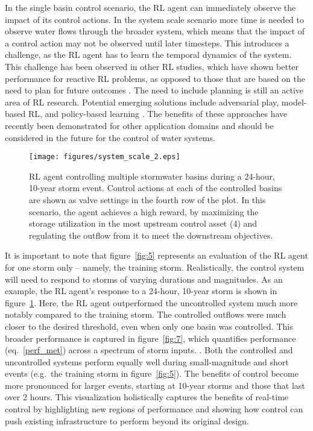 In the single basin control scenario, the RL agent can immediately observe the impact of its control actions.
In the system scale scenario more time is needed to observe water flows through the broader system, which means that the impact of a control action may not be observed until later timesteps.
This introduces a challenge, as the RL agent has to learn the temporal dynamics of the system.
This challenge has been observed in other RL studies, which have shown better performance for reactive RL problems, as opposed to those that are based on the need to plan for future outcomes \cite{aytar2018playing}.
The need to include planning is still an active area of RL research.
Potential emerging solutions include adversarial play\cite{silver2017masteringgo,Silver2017MasteringAlgorithm}, model-based RL\cite{clavera2018model}, and policy-based learning \cite{Schulman2017ProximalAlgorithms}.
The benefits of these approaches have recently been demonstrated for other application domains and should be considered in the future for the control of water systems.

\begin{figure}[H]
    \centering
    \texttt{[image: figures/system\_scale\_2.eps]}
    \caption{RL agent controlling multiple stormwater basins during a 24-hour, 10-year storm event. Control actions at each of the controlled basins are shown as valve settings in the fourth row of the plot. In this scenario, the agent achieves a high reward, by maximizing the storage utilization in the most upstream control asset (4) and regulating the outflow from it to meet the downstream objectives. }
    \label{fig:6}
\end{figure}

It is important to note that figure~\ref{fig:5} represents an evaluation of the RL agent for one storm only – namely, the training storm.
Realistically, the control system will need to respond to storms of varying durations and magnitudes.
As an example, the RL agent’s response to a 24-hour, 10-year storm is shown in figure~\ref{fig:6}.
Here, the RL agent outperformed the uncontrolled system much more notably compared to the training storm.
The controlled outflows were much closer to the desired threshold, even when only one basin was controlled.
This broader performance is captured in figure~\ref{fig:7}, which quantifies performance (eq.~\ref{perf_met}) across a spectrum of storm inputs.
.
Both the controlled  and uncontrolled systems perform equally well during small-magnitude and short events (e.g.\ the training storm in figure~\ref{fig:5}).
The benefits of control become more pronounced for larger events, starting at 10-year storms and those that last over 2 hours.
This visualization holistically captures the benefits of real-time control by highlighting new regions of performance and showing how control can push existing infrastructure to perform beyond its original design.

